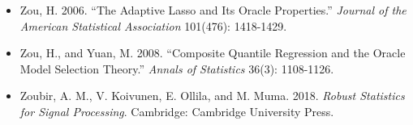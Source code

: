 \documentclass[UTF8, fontset=macnew, a4paper, 12pt]{ctexart}
\begin{document}
\begin{itemize}[leftmargin=2em, label={}, itemsep=3pt]
  \item[] Zou, H. 2006. ``The Adaptive Lasso and Its Oracle Properties.''
        \textit{Journal of the American Statistical Association}
        101(476): 1418-1429.
  \item[] Zou, H., and Yuan, M. 2008. ``Composite Quantile Regression and the Oracle
        Model Selection Theory.'' \textit{Annals of Statistics} 36(3): 1108-1126.
  \item[] Zoubir, A. M., V. Koivunen, E. Ollila, and M. Muma. 2018.
        \textit{Robust Statistics for Signal Processing}. Cambridge: Cambridge
        University Press.
\end{itemize}
\end{document}
